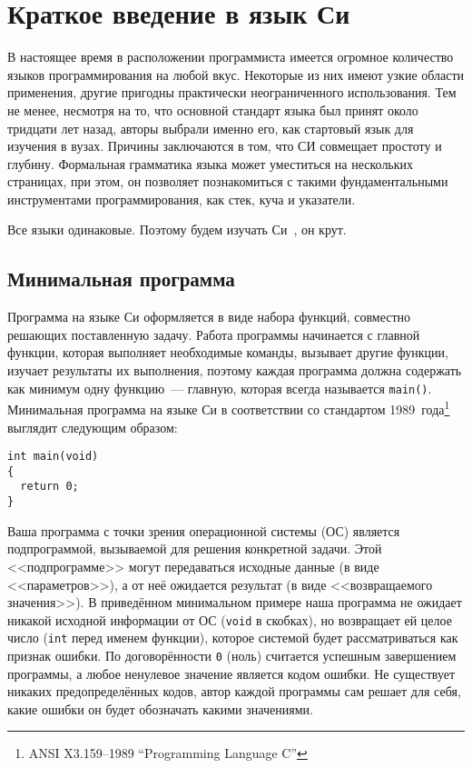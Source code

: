 \chapter{Краткое введение в язык Си}

В настоящее время в расположении программиста имеется огромное количество языков программирования на любой вкус. 
Некоторые из них имеют узкие области применения, другие пригодны практически неограниченного использования.
Тем не менее, несмотря на то, что основной стандарт языка был принят около тридцати лет назад, авторы выбрали именно
его, как стартовый язык для изучения в вузах. Причины заключаются в том, что СИ совмещает простоту и глубину. 
Формальная грамматика языка может уместиться на нескольких страницах, при этом, он позволяет познакомиться с такими
фундаментальными инструментами программирования, как стек, куча и указатели.

Все языки одинаковые. Поэтому будем изучать Си~\cite{podbelsky2015kurs}, он крут.


\section{Минимальная программа}

Программа на языке Си оформляется в виде набора функций, совместно решающих
поставленную задачу. Работа программы начинается с главной функции, которая
выполняет необходимые команды, вызывает другие функции, изучает результаты их
выполнения, поэтому каждая программа должна содержать как минимум одну
функцию~--- главную, которая всегда называется \texttt{main()}. Минимальная
программа на языке Си в соответствии со стандартом
1989~года\footnote{ANSI X3.159--1989 ``Programming Language C''} выглядит
следующим образом:

\begin{verbatim}
int main(void)
{
  return 0;
}
\end{verbatim}

Ваша программа с точки зрения операционной системы (ОС) является
подпрограммой, вызываемой для решения конкретной задачи. Этой <<подпрограмме>>
могут передаваться исходные данные (в виде <<параметров>>), а от неё ожидается
результат (в виде <<возвращаемого значения>>). В приведённом минимальном
примере наша программа не ожидает никакой исходной информации от ОС
(\texttt{void} в скобках), но возвращает ей целое число (\texttt{int} перед
именем функции), которое системой будет рассматриваться как признак ошибки. По
договорённости \texttt{0} (ноль) считается успешным завершением программы, а любое
ненулевое значение является кодом ошибки. Не существует никаких
предопределённых кодов, автор каждой программы сам решает для себя, какие
ошибки он будет обозначать какими значениями.


